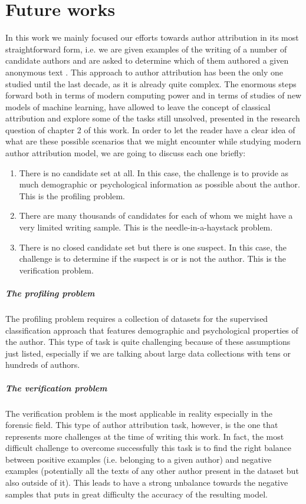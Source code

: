 \chapter{Future works}

In this work we mainly focused our efforts towards author attribution in its most straightforward form, i.e. we are given examples of the writing of a number of candidate authors and are asked
to determine which of them authored a given anonymous text \cite{koppel2009computational}.
This approach to author attribution has been the only one studied until the last decade, as it is already quite complex.
The enormous steps forward both in terms of modern computing power and in terms of studies of new models of machine learning, have allowed to leave the concept of classical attribution and explore some of the tasks still unsolved, presented in the research question of chapter 2 of this work. In order to let the reader have a clear idea of what are these possible scenarios that we might encounter while studying modern author attribution model, we are going to discuss each one briefly:
\begin{enumerate}
	\item There is no candidate set at all. In this case, the challenge is to provide as much demographic or psychological information as possible about the author. This is the profiling problem.
	\item There are many thousands of candidates for each of whom	we might have a very limited writing sample. This is the needle-in-a-haystack problem.
	\item There is no closed candidate set but there is one suspect.
	In this case, the challenge is to determine if the suspect is or is not the author. This is the verification problem.
\end{enumerate}

\paragraph{The profiling problem} The profiling problem requires a collection of datasets for the supervised classification approach that features demographic and psychological properties of the author. This type of task is quite challenging because of these assumptions just listed, especially if we are talking about large data collections with tens or hundreds of authors.

\paragraph{The verification problem} The verification problem is the most applicable in reality especially in the forensic field. This type of author attribution task, however, is the one that represents more challenges at the time of writing this work. In fact, the most difficult challenge to overcome successfully this task is to find the right balance between positive examples (i.e. belonging to a given author) and negative examples (potentially all the texts of any other author present in the dataset but also outside of it).
This leads to have a strong unbalance towards the negative samples that puts in great difficulty the accuracy of the resulting model.

